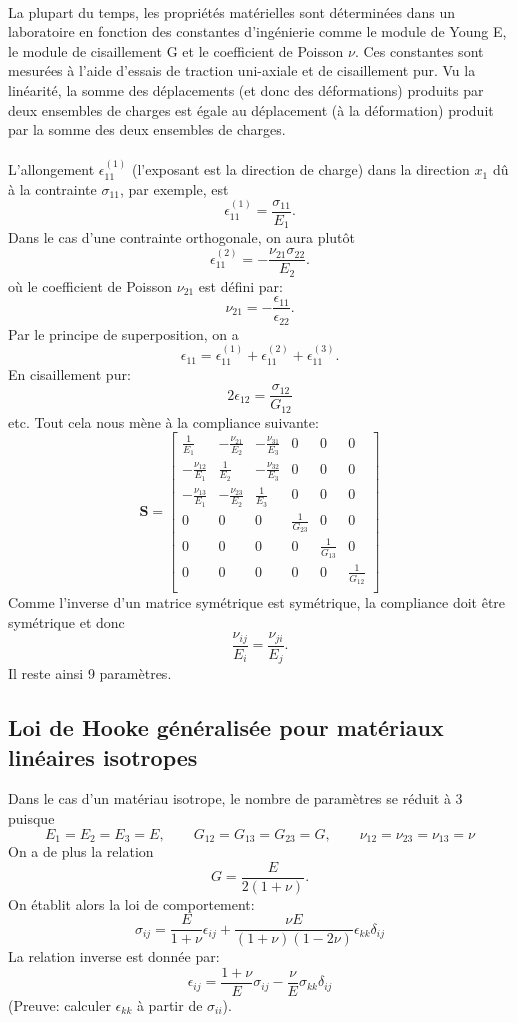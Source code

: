 \paragraph{}
La plupart du temps, les propriétés matérielles sont déterminées dans un laboratoire en fonction des constantes d'ingénierie comme le module de Young E, le module de cisaillement G et le coefficient de Poisson $\nu$. Ces constantes sont mesurées à l'aide d'essais de traction uni-axiale et de cisaillement pur. Vu la linéarité, la somme des déplacements (et donc des déformations) produits par deux ensembles de charges est égale au déplacement (à la déformation) produit par la somme des deux ensembles de charges.
\paragraph{}
L'allongement $\epsilon_{11}^{(1)}$ (l'exposant est la direction de charge) dans la direction $x_1$ dû à la contrainte $\sigma_{11}$, par exemple, est $$\epsilon_{11}^{(1)}=\frac{\sigma_{11}}{E_1}.$$ Dans le cas d'une contrainte orthogonale, on aura plutôt 
$$\epsilon_{11}^{(2)}=-\frac{\nu_{21}\sigma_{22}}{E_2}.$$ où le coefficient de Poisson $\nu_{21}$ est défini par:
$$\nu_{21}=-\frac{\epsilon_{11}}{\epsilon_{22}}.$$ Par le principe de superposition, on a 
$$\epsilon_{11}=\epsilon_{11}^{(1)}+\epsilon_{11}^{(2)}+\epsilon_{11}^{(3)}.$$
En cisaillement pur:
$$2\epsilon_{12}=\frac{\sigma_{12}}{G_{12}}$$ etc.
Tout cela nous mène à la compliance suivante:
$$\textbf{S}=
\left[
\begin{array}{cccccc}
\frac{1}{E_1}&-\frac{\nu_{21}}{E_2}&-\frac{\nu_{31}}{E_3}&0&0&0\\
-\frac{\nu_{12}}{E_1}&\frac{1}{E_2}&-\frac{\nu_{32}}{E_3}&0&0&0\\
-\frac{\nu_{13}}{E_1}&-\frac{\nu_{23}}{E_2}&\frac{1}{E_3}&0&0&0\\
0&0&0&\frac{1}{G_{23}}&0&0\\
0&0&0&0&\frac{1}{G_{13}}&0\\
0&0&0&0&0&\frac{1}{G_{12}}\\
\end{array}\right]$$
Comme l'inverse d'un matrice symétrique est symétrique, la compliance doit être symétrique et donc $$\frac{\nu_{ij}}{E_i}=\frac{\nu_{ji}}{E_j}.$$ Il reste ainsi 9 paramètres.

\subsection{Loi de Hooke généralisée pour matériaux linéaires isotropes}
Dans le cas d'un matériau isotrope, le nombre de paramètres se réduit à 3 puisque
$$E_1=E_2=E_3=E,\qquad G_{12}=G_{13}=G_{23}=G,\qquad \nu_{12}=\nu_{23}=\nu_{13}=\nu$$ On a de plus la relation $$G=\frac{E}{2(1+\nu)}.$$
On établit alors la loi de comportement:
$$\boxed{\sigma_{ij}=\frac{E}{1+\nu}\epsilon_{ij}+\frac{\nu E}{(1+\nu)(1-2\nu)}\epsilon_{kk}\delta_{ij}}$$
La relation inverse est donnée par:
$$\boxed{\epsilon_{ij}=\frac{1+\nu}{E}\sigma_{ij}-\frac{\nu}{E}\sigma_{kk}\delta_{ij}}$$
(Preuve: calculer $\epsilon_{kk}$ à partir de $\sigma_{ii}$).
